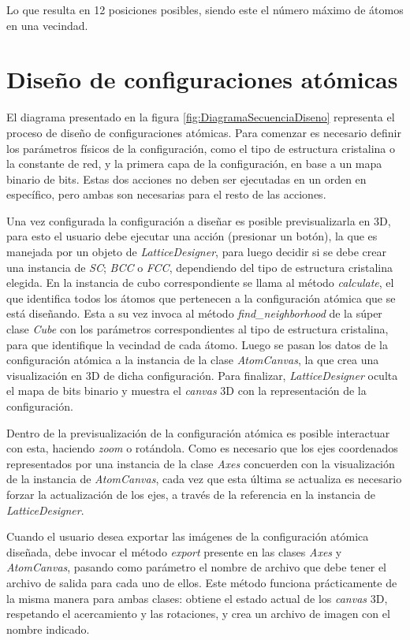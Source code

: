 Lo que resulta en 12 posiciones posibles, siendo este el número máximo de átomos en una vecindad.

\section{Diseño de configuraciones atómicas}

\label{section:disenoConfiguraciones}


El diagrama presentado en la figura \ref{fig:DiagramaSecuenciaDiseno} representa el proceso de diseño de configuraciones atómicas. Para comenzar es necesario definir los parámetros físicos de la configuración, como el tipo de estructura cristalina o la constante de red, y la primera capa de la configuración, en base a un mapa binario de bits. Estas dos acciones no deben ser ejecutadas en un orden en específico, pero ambas son necesarias para el resto de las acciones.

Una vez configurada la configuración a diseñar es posible previsualizarla en 3D, para esto el usuario debe ejecutar una acción (presionar un botón), la que es manejada por un objeto de \emph{LatticeDesigner}, para luego decidir si se debe crear una instancia de \emph{SC}; \emph{BCC} o \emph{FCC}, dependiendo del tipo de estructura cristalina elegida. En la instancia de cubo correspondiente se llama al método \emph{calculate}, el que identifica todos los átomos que pertenecen a la configuración atómica que se está diseñando. Esta a su vez invoca al método \emph{find\_neighborhood} de la súper clase \emph{Cube} con los parámetros correspondientes al tipo de estructura cristalina, para que identifique la vecindad de cada átomo. Luego se pasan los datos de la configuración atómica a la instancia de la clase \emph{AtomCanvas}, la que crea una visualización en 3D de dicha configuración. Para finalizar, \emph{LatticeDesigner} oculta el mapa de bits binario y muestra el \emph{canvas} 3D con la representación de la configuración.

Dentro de la previsualización de la configuración atómica es posible interactuar con esta, haciendo \emph{zoom} o rotándola. Como es necesario que los ejes coordenados representados por una instancia de la clase \emph{Axes} concuerden con la visualización de la instancia de \emph{AtomCanvas}, cada vez que esta última se actualiza es necesario forzar la actualización de los ejes, a través de la referencia en la instancia de \emph{LatticeDesigner}.

Cuando el usuario desea exportar las imágenes de la configuración atómica diseñada, debe invocar el método \emph{export} presente en las clases \emph{Axes} y \emph{AtomCanvas}, pasando como parámetro el nombre de archivo que debe tener el archivo de salida para cada uno de ellos. Este método funciona prácticamente de la misma manera para ambas clases: obtiene el estado actual de los \emph{canvas} 3D, respetando el acercamiento y las rotaciones, y crea un archivo de imagen con el nombre indicado.

